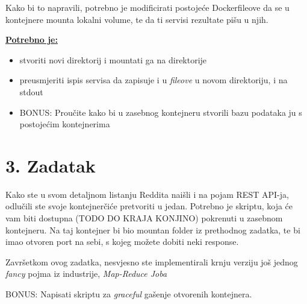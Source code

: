 \documentclass[12pt,a4paper]{article}
\begin{document}
Kako bi to napravili, potrebno je modificirati postojeće Dockerfileove da se u kontejnere mounta lokalni volume, te da ti servisi rezultate pišu u njih.


\underline{\textbf{Potrebno je:}}
\begin{itemize}
	\item stvoriti novi direktorij i mountati ga na direktorije
	\item preusmjeriti ispis servisa da zapisuje i u \textit{fileove} u novom direktoriju, i na stdout
	\item BONUS: Proučite kako bi u zasebnog kontejneru stvorili bazu podataka  ju s postojećim kontejnerima
\end{itemize}

\newpage

\section*{3. Zadatak}

Kako ste u svom detaljnom listanju Reddita naišli i na pojam REST API-ja, odlučili ste svoje kontejnerčiće pretvoriti u jedan. Potrebno je skriptu, koja će vam biti dostupna (TODO DO KRAJA KONJINO) pokrenuti u zasebnom kontejneru. Na taj kontejner bi bio mountan folder iz prethodnog zadatka, te bi imao otvoren port na sebi, s kojeg možete dobiti neki response. 

Završetkom ovog zadatka, nesvjesno ste implementirali krnju verziju još jednog \textit{fancy} pojma iz industrije, \textit{Map-Reduce Joba}

BONUS: Napisati skriptu za \textit{graceful} gašenje otvorenih kontejnera.
\end{document}
